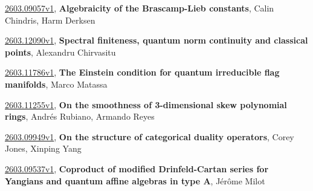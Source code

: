 \documentclass[9pt, a4paper]{article}
\theoremstyle{plain}
\theoremstyle{definition}
\theoremstyle{remark}
\newcommand{\arxiv}[3]{\href{https://arxiv.org/abs/#1}{#1}, \textbf{\textcolor{arxivblue}{#2}}, #3}
\begin{document}
\arxiv{2603.09057v1}{Algebraicity of the Brascamp-Lieb constants}{Calin Chindris, Harm Derksen}

\arxiv{2603.12090v1}{Spectral finiteness, quantum norm continuity and classical points}{Alexandru Chirvasitu}

\arxiv{2603.11786v1}{The Einstein condition for quantum irreducible flag manifolds}{Marco Matassa}

\arxiv{2603.11255v1}{On the smoothness of 3-dimensional skew polynomial rings}{Andrés Rubiano, Armando Reyes}

\arxiv{2603.09949v1}{On the structure of categorical duality operators}{Corey Jones, Xinping Yang}

\arxiv{2603.09537v1}{Coproduct of modified Drinfeld-Cartan series for Yangians and quantum affine algebras in type A}{Jérôme Milot}

\end{document}
